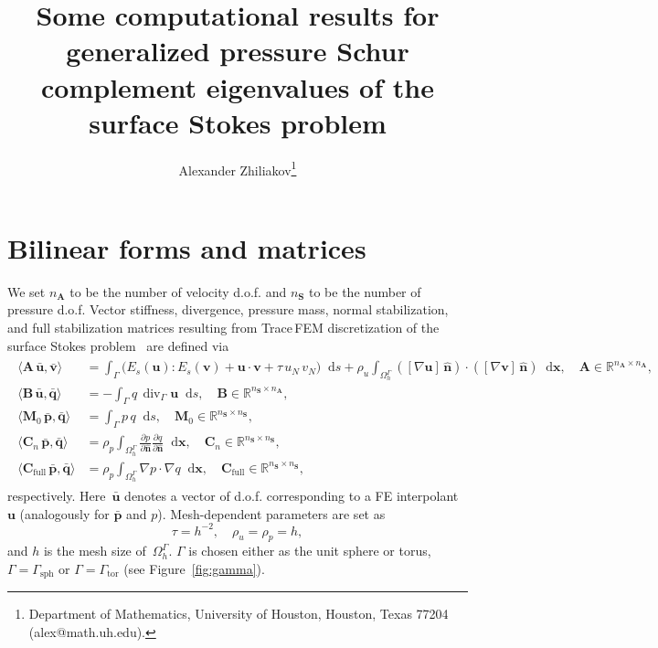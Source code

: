 \documentclass[12pt]{article}
\title{Some computational results for generalized pressure Schur complement eigenvalues of the surface Stokes problem}
\author{
	Alexander Zhiliakov\thanks{Department of Mathematics, University of Houston, Houston, Texas 77204 (alex@math.uh.edu).}
}
\newcommand{\vect}[1]{\boldsymbol{\mathbf{#1}}}
\newcommand*\diff{\mathop{}\!\mathrm{d}}
\DeclareMathOperator{\Div}{div}
\newcommand{\sphere}{{\Gamma_{\text{sph}}}}
\newcommand{\tor}{{\Gamma_{\text{tor}}}}
\begin{document}
	
\maketitle
	
\let\oldtabular\tabular
\renewcommand{\tabular}[1][1.5]{\def\arraystretch{#1}\oldtabular}

\section{Bilinear forms and matrices}

We set $n_{\vect A}$ to be the number of velocity d.o.f. and $n_{\vect S}$ to be the number of pressure d.o.f. Vector stiffness, divergence, pressure mass, normal stabilization, and full stabilization matrices resulting from Trace\,FEM discretization of the surface Stokes problem~\cite{surfstokes} are defined via
\begin{align}\begin{split}
	\langle \vect A\,\bar{\vect u}, \bar{\vect v} \rangle &= 
		\int_{\Gamma} \big( E_s(\vect u) : E_s(\vect v) + \vect u\cdot\vect v + \tau\,u_N\,v_N \big) \diff{s} + 
		\rho_u \int_{\Omega_h^{\Gamma}} ([\nabla\vect u]\,\hat{\vect n})\cdot([\nabla\vect v]\,\hat{\vect n}) \diff{\vect x}, \quad \vect A \in \mathbb R^{n_{\vect A} \times n_{\vect A}},\\
	\langle \vect B\,\bar{\vect u}, \bar{\vect q} \rangle &= 
		-\int_{\Gamma} q\,\Div_{\Gamma} \vect u \diff{s}, \quad \vect B \in \mathbb R^{n_{\vect S} \times n_{\vect A}},\\
	\langle \vect M_0\,\bar{\vect p}, \bar{\vect q} \rangle &=
		\int_{\Gamma} p\,q \diff{s}, \quad \vect M_0 \in \mathbb R^{n_{\vect S} \times n_{\vect S}},\\
	\langle \vect C_n\,\bar{\vect p}, \bar{\vect q} \rangle &=
		\rho_p \int_{\Omega^{\Gamma}_h} \frac{\partial p}{\partial\hat{\vect n}} \frac{\partial q}{\partial\hat{\vect n}} \diff{\vect x}, \quad \vect C_n \in \mathbb R^{n_{\vect S} \times n_{\vect S}},\\
	\langle \vect C_{\text{full}}\,\bar{\vect p}, \bar{\vect q} \rangle &=
		\rho_p \int_{\Omega^{\Gamma}_h} \nabla p \cdot \nabla q \diff{\vect x}, \quad \vect C_{\text{full}} \in \mathbb R^{n_{\vect S} \times n_{\vect S}},		 
\end{split}\end{align}
respectively. Here~$\bar{\vect u}$ denotes a vector of d.o.f. corresponding to a FE interpolant~$\vect u$ (analogously for $\bar{\vect p}$ and $p$). Mesh-dependent parameters are set as
\begin{equation}
	\tau = h^{-2}, \quad \rho_u = \rho_p = h,
\end{equation}
and $h$ is the mesh size of~$\Omega^{\Gamma}_h$. $\Gamma$ is chosen either as the unit sphere or torus, $\Gamma = \sphere$ or $\Gamma = \tor$ (see Figure~\ref{fig:gamma}).
\end{document}
